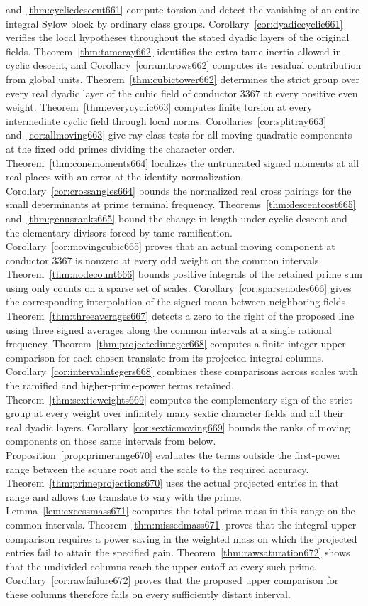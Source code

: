 \documentclass[a4paper,11pt]{article}
\theoremstyle{definition}
\theoremstyle{remark}
\numberwithin{equation}{section}
\begin{document}
and~\ref{thm:cyclicdescent661} compute torsion and detect the vanishing of an entire integral Sylow block by ordinary class groups. Corollary~\ref{cor:dyadiccyclic661} verifies the local hypotheses throughout the stated dyadic layers of the original fields. Theorem~\ref{thm:tameray662} identifies the extra tame inertia allowed in cyclic descent, and Corollary~\ref{cor:unitrows662} computes its residual contribution from global units. Theorem~\ref{thm:cubictower662} determines the strict group over every real dyadic layer of the cubic field of conductor \(3367\) at every positive even weight. Theorem~\ref{thm:everycyclic663} computes finite torsion at every intermediate cyclic field through local norms. Corollaries~\ref{cor:splitray663} and~\ref{cor:allmoving663} give ray class tests for all moving quadratic components at the fixed odd primes dividing the character order. Theorem~\ref{thm:conemoments664} localizes the untruncated signed moments at all real places with an error at the identity normalization. Corollary~\ref{cor:crossangles664} bounds the normalized real cross pairings for the small determinants at prime terminal frequency. Theorems~\ref{thm:descentcost665} and~\ref{thm:genusranks665} bound the change in length under cyclic descent and the elementary divisors forced by tame ramification. Corollary~\ref{cor:movingcubic665} proves that an actual moving component at conductor \(3367\) is nonzero at every odd weight on the common intervals. Theorem~\ref{thm:nodecount666} bounds positive integrals of the retained prime sum using only counts on a sparse set of scales. Corollary~\ref{cor:sparsenodes666} gives the corresponding interpolation of the signed mean between neighboring fields. Theorem~\ref{thm:threeaverages667} detects a zero to the right of the proposed line using three signed averages along the common intervals at a single rational frequency. Theorem~\ref{thm:projectedinteger668} computes a finite integer upper comparison for each chosen translate from its projected integral columns. Corollary~\ref{cor:intervalintegers668} combines these comparisons across scales with the ramified and higher-prime-power terms retained. Theorem~\ref{thm:sexticweights669} computes the complementary sign of the strict group at every weight over infinitely many sextic character fields and all their real dyadic layers. Corollary~\ref{cor:sexticmoving669} bounds the ranks of moving components on those same intervals from below. Proposition~\ref{prop:primerange670} evaluates the terms outside the first-power range between the square root and the scale to the required accuracy. Theorem~\ref{thm:primeprojections670} uses the actual projected entries in that range and allows the translate to vary with the prime. Lemma~\ref{lem:excessmass671} computes the total prime mass in this range on the common intervals. Theorem~\ref{thm:missedmass671} proves that the integral upper comparison requires a power saving in the weighted mass on which the projected entries fail to attain the specified gain. Theorem~\ref{thm:rawsaturation672} shows that the undivided columns reach the upper cutoff at every such prime. Corollary~\ref{cor:rawfailure672} proves that the proposed upper comparison for these columns therefore fails on every sufficiently distant interval. 
\end{document}
